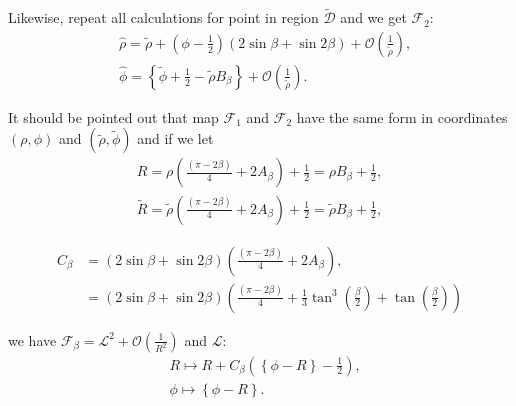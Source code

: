 \documentclass{article}
\numberwithin{figure}{section}
\numberwithin{equation}{section}
\theoremstyle{remark}
\theoremstyle{definition}
\begin{document}
Likewise, repeat all calculations for point in region $\mathcal{\widetilde{D}}$ and we get $\mathcal{F}_2$:
\begin{equation}
	\begin{split}
		&\hat{\rho}=\widetilde{\rho}+\left(\phi-\frac{1}{2}\right)\left(2\sin\beta+\sin2\beta\right)+\mathcal{O}\left(\frac{1}{\widetilde{\rho}}\right),\\
		&\hat{\phi}=\left\{\widetilde{\phi}+\frac{1}{2}-\widetilde{\rho} B_\beta\right\}+\mathcal{O}\left(\frac{1}{\widetilde{\rho}}\right).
	\end{split}
\end{equation}

It should be pointed out that map $\mathcal{F}_1$ and $\mathcal{F}_2$ have the same form in coordinates $(\rho,\phi)$ and $(\widetilde{\rho},\widetilde{\phi})$ and if we let
\begin{align*}
	R=\rho\left(\frac{(\pi-2\beta)}{4}+2A_\beta\right)+\frac{1}{2}=\rho B_\beta+\frac{1}{2},\\ \widetilde{R}=\widetilde{\rho}\left(\frac{(\pi-2\beta)}{4}+2A_\beta\right)+\frac{1}{2}=\widetilde{\rho} B_\beta+\frac{1}{2},
\end{align*}

\begin{align*}
	C_\beta&=(2\sin\beta+\sin2\beta)\left(\frac{(\pi-2\beta)}{4}+2A_\beta\right),\\
	&=(2\sin\beta+\sin2\beta)\left(\frac{(\pi-2\beta)}{4}+\frac{1}{3}\tan^3\left(\frac{\beta}{2}\right)+\tan\left(\frac{\beta}{2}\right)\right)
\end{align*}

we have $\mathcal{F}_\beta=\mathcal{L}^2+\mathcal{O}\left(\frac{1}{R^2}\right)$ and $\mathcal{L}$: 
\begin{align*}
	&R\mapsto R+C_\beta\left(\left\{\phi-R\right\}-\frac{1}{2}\right),\\
	&\phi\mapsto \left\{\phi-R\right\}.
\end{align*}
\end{document}
